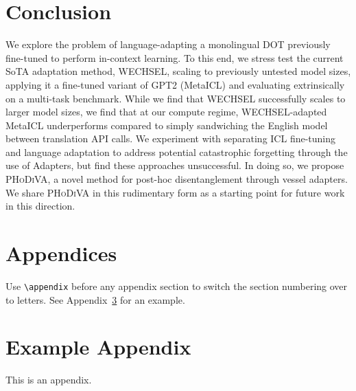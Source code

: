 \documentclass[11pt]{article}
\begin{document}
\section{Conclusion}

We explore the problem of language-adapting a monolingual DOT previously fine-tuned to perform
in-context learning. To this end, we stress test the current SoTA adaptation method, WECHSEL,
scaling to previously untested model sizes, applying it a fine-tuned variant of GPT2 (MetaICL) and
evaluating extrinsically on a multi-task benchmark. While we find that WECHSEL successfully scales
to larger model sizes, we find that at our compute regime, WECHSEL-adapted MetaICL underperforms
compared to simply sandwiching the English model between translation API calls. We experiment with
separating ICL fine-tuning and language adaptation to address potential catastrophic forgetting
through the use of Adapters, but find these approaches unsuccessful. In doing so, we propose
\textsc{PHoDiVA}, a novel method for post-hoc disentanglement through vessel adapters. We share
\textsc{PHoDiVA} in this rudimentary form as a starting point for future work in this direction.



\section{Appendices}

Use \verb|\appendix| before any appendix section to switch the section numbering over to letters.
See Appendix~\ref{sec:appendix} for an example.

\appendix
\section{Example Appendix}
\label{sec:appendix}

This is an appendix.
\end{document}
